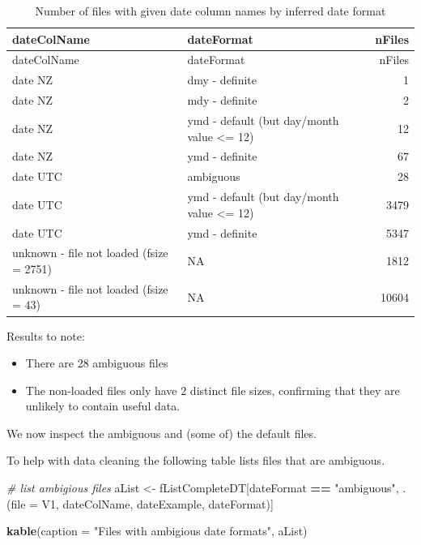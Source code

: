 \documentclass[]{article}
\newenvironment{Shaded}{\begin{snugshade}}{\end{snugshade}}
\newcommand{\KeywordTok}[1]{\textcolor[rgb]{0.13,0.29,0.53}{\textbf{#1}}}
\newcommand{\DataTypeTok}[1]{\textcolor[rgb]{0.13,0.29,0.53}{#1}}
\newcommand{\StringTok}[1]{\textcolor[rgb]{0.31,0.60,0.02}{#1}}
\newcommand{\CommentTok}[1]{\textcolor[rgb]{0.56,0.35,0.01}{\textit{#1}}}
\newcommand{\OperatorTok}[1]{\textcolor[rgb]{0.81,0.36,0.00}{\textbf{#1}}}
\newcommand{\NormalTok}[1]{#1}
\providecommand{\tightlist}{%
  \setlength{\itemsep}{0pt}\setlength{\parskip}{0pt}}
\begin{document}
\begin{longtable}[]{@{}llr@{}}
\caption{Number of files with given date column names by inferred date
format}\tabularnewline
\toprule
dateColName & dateFormat & nFiles\tabularnewline
\midrule
\endfirsthead
\toprule
dateColName & dateFormat & nFiles\tabularnewline
\midrule
\endhead
date NZ & dmy - definite & 1\tabularnewline
date NZ & mdy - definite & 2\tabularnewline
date NZ & ymd - default (but day/month value \textless{}= 12) &
12\tabularnewline
date NZ & ymd - definite & 67\tabularnewline
date UTC & ambiguous & 28\tabularnewline
date UTC & ymd - default (but day/month value \textless{}= 12) &
3479\tabularnewline
date UTC & ymd - definite & 5347\tabularnewline
unknown - file not loaded (fsize = 2751) & NA & 1812\tabularnewline
unknown - file not loaded (fsize = 43) & NA & 10604\tabularnewline
\bottomrule
\end{longtable}

Results to note:

\begin{itemize}
\tightlist
\item
  There are 28 ambiguous files
\item
  The non-loaded files only have 2 distinct file sizes, confirming that
  they are unlikely to contain useful data.
\end{itemize}

We now inspect the ambiguous and (some of) the default files.

To help with data cleaning the following table lists files that are
ambiguous.

\begin{Shaded}
\begin{Highlighting}[]
\CommentTok{# list ambigious files}
\NormalTok{aList <-}\StringTok{ }\NormalTok{fListCompleteDT[dateFormat }\OperatorTok{==}\StringTok{ "ambiguous"}\NormalTok{, .(}\DataTypeTok{file =}\NormalTok{ V1, dateColName, dateExample, dateFormat)]}

\KeywordTok{kable}\NormalTok{(}\DataTypeTok{caption =} \StringTok{"Files with ambigious date formats"}\NormalTok{, aList)}
\end{Highlighting}
\end{Shaded}
\end{document}
